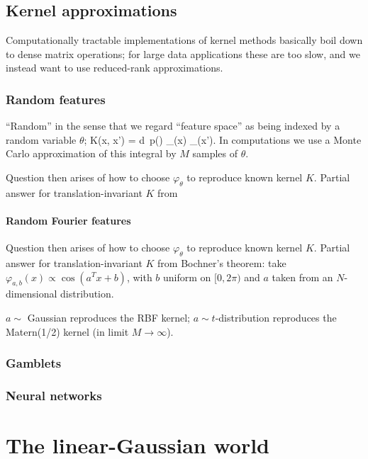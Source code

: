 \documentclass[notitlepage,openany,11pt]{report}
\theoremstyle{plain}%
\numberwithin{equation}{section}
\begin{document}
\section{Kernel approximations}
Computationally tractable implementations of kernel methods basically boil down to dense matrix operations; for large data applications these are too slow, and we instead want to use reduced-rank approximations.

\subsection{Random features}
``Random'' in the sense that we regard ``feature space'' as being indexed by a random variable $\theta$; 
\be
K(x, x') = \int \! d\theta \, p(\theta) \varphi_{\theta}(x) \varphi_{\theta}(x').
\ee
In computations we use a Monte Carlo approximation of this integral by $M$ samples of $\theta$.

Question then arises of how to choose $\varphi_{\theta}$ to reproduce known kernel $K$. Partial answer for translation-invariant $K$ from 

\subsubsection{Random Fourier features}
Question then arises of how to choose $\varphi_{\theta}$ to reproduce known kernel $K$. Partial answer for translation-invariant $K$ from Bochner's theorem: take $\varphi_{a,b}(x) \propto \cos(a^{T}x + b)$, with $b$ uniform on $[0, 2\pi)$ and $a$ taken from an $N$-dimensional distribution. 

$a \sim$ Gaussian reproduces the RBF kernel; $a \sim t$-distribution reproduces the Matern(1/2) kernel (in limit $M \to \infty$).


\subsection{Gamblets}

\subsection{Neural networks}

\chapter{The linear-Gaussian world}
\end{document}
